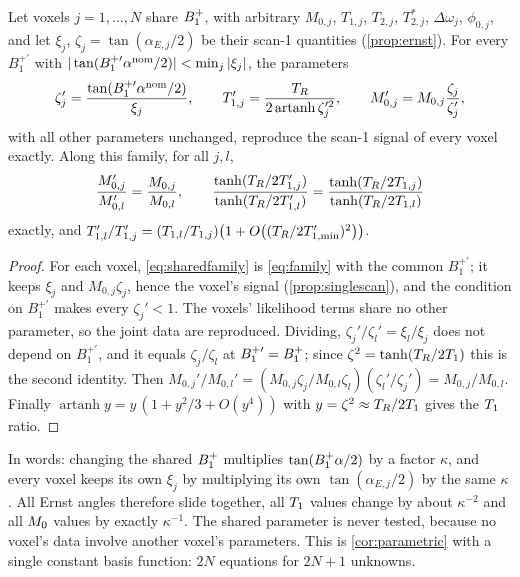 \begin{proposition}\label{prop:shared}
Let voxels $j=1,\dots,N$ share $B_1^{+}$, with arbitrary $M_{0,j}$, $T_{1,j}$, $T_{2,j}$, $T_{2,j}^{*}$, $\Delta\omega_j$, $\phi_{0,j}$,
and let $\xi_j$, $\zeta_j=\tan(\alpha_{E,j}/2)$ be their scan-1 quantities (\cref{prop:ernst}). For every
$B_1^{+\prime}$ with $|\tan(B_1^{+\prime}\alpha^{\rm nom}/2)|<\min_j|\xi_j|$, the parameters
\begin{equation}
  \zeta_j'=\frac{\tan(B_1^{+\prime}\alpha^{\rm nom}/2)}{\xi_j},\qquad
  T_{1,j}'=\frac{T_R}{2\operatorname{artanh}\zeta_j'^2},\qquad
  M_{0,j}'=M_{0,j}\frac{\zeta_j}{\zeta_j'},
  \label{eq:sharedfamily}
\end{equation}
with all other parameters unchanged, reproduce the scan-1 signal of every voxel exactly. Along
this family, for all $j,l$,
\begin{equation}
  \frac{M_{0,j}'}{M_{0,l}'}=\frac{M_{0,j}}{M_{0,l}},\qquad
  \frac{\tanh(T_R/2T_{1,j}')}{\tanh(T_R/2T_{1,l}')}=\frac{\tanh(T_R/2T_{1,j})}{\tanh(T_R/2T_{1,l})}
  \label{eq:sharedratios}
\end{equation}
exactly, and $T_{1,l}'/T_{1,j}'=(T_{1,l}/T_{1,j})\bigl(1+O\bigl((T_R/2T_{1,\min}')^2\bigr)\bigr)$.
\end{proposition}
\begin{proof}
For each voxel, \eqref{eq:sharedfamily} is \eqref{eq:family} with the common $B_1^{+\prime}$; it keeps $\xi_j$
and $M_{0,j}\zeta_j$, hence the voxel's signal (\cref{prop:singlescan}), and the condition on $B_1^{+\prime}$ makes
every $\zeta_j'<1$. The voxels' likelihood terms share no other parameter, so the joint data are
reproduced. Dividing, $\zeta_j'/\zeta_l'=\xi_l/\xi_j$ does not depend on $B_1^{+\prime}$, and it equals $\zeta_j/\zeta_l$ at
$B_1^{+\prime}=B_1^{+}$; since $\zeta^2=\tanh(T_R/2T_1)$ this is the second identity. Then
$M_{0,j}'/M_{0,l}'=(M_{0,j}\zeta_j/M_{0,l}\zeta_l)(\zeta_l'/\zeta_j')=M_{0,j}/M_{0,l}$. Finally
$\operatorname{artanh}y=y\,(1+y^2/3+O(y^4))$ with $y=\zeta^2\approx T_R/2T_1$ gives the $T_1$ ratio.
\end{proof}

In words: changing the shared $B_1^{+}$ multiplies $\tan(B_1^{+}\alpha/2)$ by a factor $\kappa$, and every voxel keeps
its own $\xi_j$ by multiplying its own $\tan(\alpha_{E,j}/2)$ by the same $\kappa$. All Ernst angles therefore
slide together, all $T_1$ values change by about $\kappa^{-2}$ and all $M_0$ values by exactly
$\kappa^{-1}$. The shared parameter is never tested, because no voxel's data
involve another voxel's parameters. This is \cref{cor:parametric} with a single constant basis
function: $2N$ equations for $2N+1$ unknowns.

